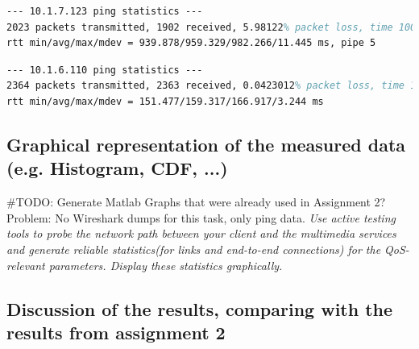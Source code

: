 \documentclass[parskip=full]{scrartcl}
\begin{document}
\begin{lstlisting}[language=tex, breaklines, frame=single, caption={Landline Network Parameters}, label=lst:landlineNetwork, float, floatplacement=h]
--- 10.1.7.123 ping statistics ---
2023 packets transmitted, 1902 received, 5.98122% packet loss, time 1004ms
rtt min/avg/max/mdev = 939.878/959.329/982.266/11.445 ms, pipe 5
\end{lstlisting}

\begin{lstlisting}[language=tex, breaklines, frame=single, caption={Landline Network Parameters}, label=lst:landlineNetwork, float, floatplacement=h]
--- 10.1.6.110 ping statistics ---
2364 packets transmitted, 2363 received, 0.0423012% packet loss, time 1105ms
rtt min/avg/max/mdev = 151.477/159.317/166.917/3.244 ms
\end{lstlisting}


\subsection{Graphical representation of the measured data (e.g. Histogram, CDF, ...)}

\#TODO: Generate Matlab Graphs that were already used in Assignment 2?
Problem: No Wireshark dumps for this task, only ping data. 
\textit{Use active testing tools to probe the network path between your client and the multimedia services and generate reliable statistics(for links and end-to-end connections) for the QoS-relevant parameters. Display these statistics graphically.}
\subsection{Discussion of the results, comparing with the results from assignment 2}

\end{document}

